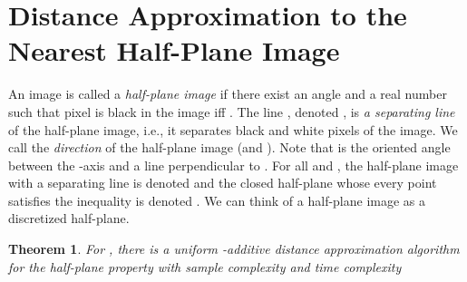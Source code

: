 \documentclass[11pt,english]{article}
\newtheorem{theorem}{Theorem}[section]
\numberwithin{figure}{section}
\begin{document}
\section{Distance Approximation to the Nearest Half-Plane Image}\label{sec:half-plane}
{\color{black} 
{\color{black} An image is called a \emph{half-plane image}} if there exist an angle  and a real number  such that pixel  is black in the image iff . The line , denoted , is {\em a separating line} of the half-plane image, i.e., it
separates black and white pixels of the image. We call  the {\em direction} of the half-plane image (and ). Note that  is the oriented angle between the -axis and a line perpendicular to . For all  and , the half-plane image with a separating line  is denoted  and the closed half-plane whose every point  satisfies the inequality  is denoted . We can think of a half-plane image as a discretized half-plane.
 
}
\begin{theorem}\label{thm:half-plane-dist-appr}
For , there is a uniform -additive distance approximation algorithm for the half-plane property with sample complexity   and time complexity 
\end{theorem}
\end{document}
